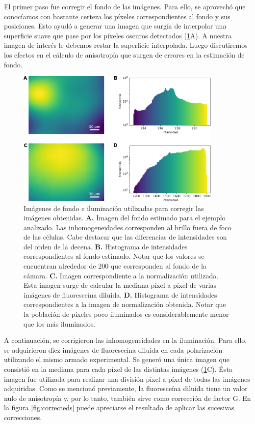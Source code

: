 El primer paso fue corregir el fondo de las imágenes. Para ello, se aprovechó que conocíamos con bastante certeza los píxeles correspondientes al fondo y sus posiciones. Esto ayudó a generar una imagen que surgía de interpolar una superficie suave que pase por los píxeles oscuros detectados (\cref{fig:correcciones}A). A nuestra imagen de interés le debemos restar la superficie interpolada. Luego discutiremos los efectos en el cálculo de anisotropía que surgen de errores en la estimación de fondo.

\begin{figure}[htb]
    \centering
    \includegraphics[width=0.9\textwidth]{img/cap_2/correcciones.pdf}
    \caption{\footnotesize{Imágenes de fondo e iluminación utilizadas para corregir las imágenes obtenidas. \textbf{A.} Imagen del fondo estimado para el ejemplo analizado. Las inhomogeneidades corresponden al brillo  fuera de foco de las células. Cabe destacar que las diferencias de intensidades son del orden de la decena. \textbf{B.} Histograma de intensidades correspondientes al fondo estimado. Notar que los valores se encuentran alrededor de 200 que corresponden al fondo de la cámara. \textbf{C.} Imagen correspondiente a la normalización utilizada. Esta imagen surge de calcular la mediana píxel a píxel de varias imágenes de fluoresceína diluida. \textbf{D.} Histograma de intensidades correspondientes a la imagen de normalización obtenida. Notar que la población de píxeles poco iluminados es considerablemente menor que los más iluminados.}}
    \label{fig:correcciones}
\end{figure}

A continuación, se corrigieron las inhomogeneidades en la iluminación. Para ello, se adquirieron diez imágenes de fluoresceína diluida en cada polarización utilizando el mismo armado experimental. Se generó una única imagen que consistió en la mediana para cada píxel de las distintas imágenes (\cref{fig:correcciones}C). Ésta imagen fue utilizada para realizar una división píxel a píxel de todas las imágenes adquiridas. Como se mencionó previamente, la fluoresceína diluida tiene un valor nulo de anisotropía y, por lo tanto, también sirve como corrección de factor G. En la figura \ref{fig:correcteds} puede apreciarse el resultado de aplicar las sucesivas correcciones.

